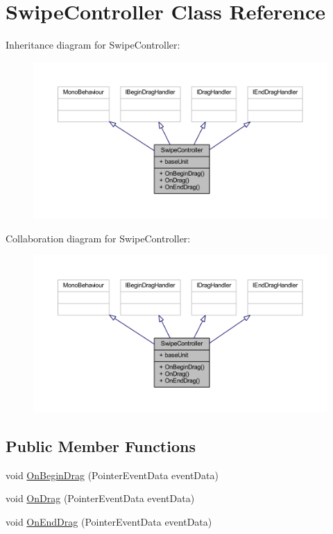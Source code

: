 \hypertarget{class_swipe_controller}{}\section{Swipe\+Controller Class Reference}
\label{class_swipe_controller}


Inheritance diagram for Swipe\+Controller\+:
\nopagebreak
\begin{figure}[H]
\begin{center}
\leavevmode
\includegraphics[width=350pt]{class_swipe_controller__inherit__graph}
\end{center}
\end{figure}


Collaboration diagram for Swipe\+Controller\+:
\nopagebreak
\begin{figure}[H]
\begin{center}
\leavevmode
\includegraphics[width=350pt]{class_swipe_controller__coll__graph}
\end{center}
\end{figure}
\subsection*{Public Member Functions}
\begin{DoxyCompactItemize}
\item 
void \mbox{\hyperlink{class_swipe_controller_a6f7b3f648901c5cc45a9da620ec7ccfa}{On\+Begin\+Drag}} (Pointer\+Event\+Data event\+Data)
\item 
void \mbox{\hyperlink{class_swipe_controller_a5d6462d855ab4cd7496dde16c7eba5f3}{On\+Drag}} (Pointer\+Event\+Data event\+Data)
\item 
void \mbox{\hyperlink{class_swipe_controller_a59530aa6a8d5a2de12d7f39851ce3d2b}{On\+End\+Drag}} (Pointer\+Event\+Data event\+Data)
\end{DoxyCompactItemize}

